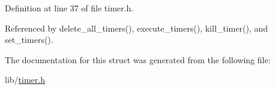 Definition at line 37 of file timer.\-h.



Referenced by delete\-\_\-all\-\_\-timers(), execute\-\_\-timers(), kill\-\_\-timer(), and set\-\_\-timers().



The documentation for this struct was generated from the following file\-:\begin{DoxyCompactItemize}
\item 
lib/\hyperlink{timer_8h}{timer.\-h}\end{DoxyCompactItemize}
